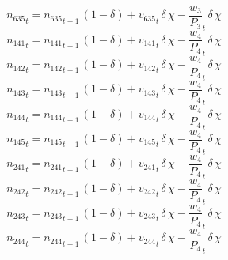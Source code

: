 \begin{dmath}
{{n_{635}}}_{t}={{n_{635}}}_{t-1}\, \left(1-{{\delta}}\right)+{{v_{635}}}_{t}\, {{\delta}}\, {{\chi}}-{{\frac{w_{3}}{P_{3}}}}_{t}\, {{\delta}}\, {{\chi}}
\end{dmath}
\begin{dmath}
{{n_{141}}}_{t}={{n_{141}}}_{t-1}\, \left(1-{{\delta}}\right)+{{v_{141}}}_{t}\, {{\delta}}\, {{\chi}}-{{\frac{w_{4}}{P_{4}}}}_{t}\, {{\delta}}\, {{\chi}}
\end{dmath}
\begin{dmath}
{{n_{142}}}_{t}={{n_{142}}}_{t-1}\, \left(1-{{\delta}}\right)+{{v_{142}}}_{t}\, {{\delta}}\, {{\chi}}-{{\frac{w_{4}}{P_{4}}}}_{t}\, {{\delta}}\, {{\chi}}
\end{dmath}
\begin{dmath}
{{n_{143}}}_{t}={{n_{143}}}_{t-1}\, \left(1-{{\delta}}\right)+{{v_{143}}}_{t}\, {{\delta}}\, {{\chi}}-{{\frac{w_{4}}{P_{4}}}}_{t}\, {{\delta}}\, {{\chi}}
\end{dmath}
\begin{dmath}
{{n_{144}}}_{t}={{n_{144}}}_{t-1}\, \left(1-{{\delta}}\right)+{{v_{144}}}_{t}\, {{\delta}}\, {{\chi}}-{{\frac{w_{4}}{P_{4}}}}_{t}\, {{\delta}}\, {{\chi}}
\end{dmath}
\begin{dmath}
{{n_{145}}}_{t}={{n_{145}}}_{t-1}\, \left(1-{{\delta}}\right)+{{v_{145}}}_{t}\, {{\delta}}\, {{\chi}}-{{\frac{w_{4}}{P_{4}}}}_{t}\, {{\delta}}\, {{\chi}}
\end{dmath}
\begin{dmath}
{{n_{241}}}_{t}={{n_{241}}}_{t-1}\, \left(1-{{\delta}}\right)+{{v_{241}}}_{t}\, {{\delta}}\, {{\chi}}-{{\frac{w_{4}}{P_{4}}}}_{t}\, {{\delta}}\, {{\chi}}
\end{dmath}
\begin{dmath}
{{n_{242}}}_{t}={{n_{242}}}_{t-1}\, \left(1-{{\delta}}\right)+{{v_{242}}}_{t}\, {{\delta}}\, {{\chi}}-{{\frac{w_{4}}{P_{4}}}}_{t}\, {{\delta}}\, {{\chi}}
\end{dmath}
\begin{dmath}
{{n_{243}}}_{t}={{n_{243}}}_{t-1}\, \left(1-{{\delta}}\right)+{{v_{243}}}_{t}\, {{\delta}}\, {{\chi}}-{{\frac{w_{4}}{P_{4}}}}_{t}\, {{\delta}}\, {{\chi}}
\end{dmath}
\begin{dmath}
{{n_{244}}}_{t}={{n_{244}}}_{t-1}\, \left(1-{{\delta}}\right)+{{v_{244}}}_{t}\, {{\delta}}\, {{\chi}}-{{\frac{w_{4}}{P_{4}}}}_{t}\, {{\delta}}\, {{\chi}}
\end{dmath}
